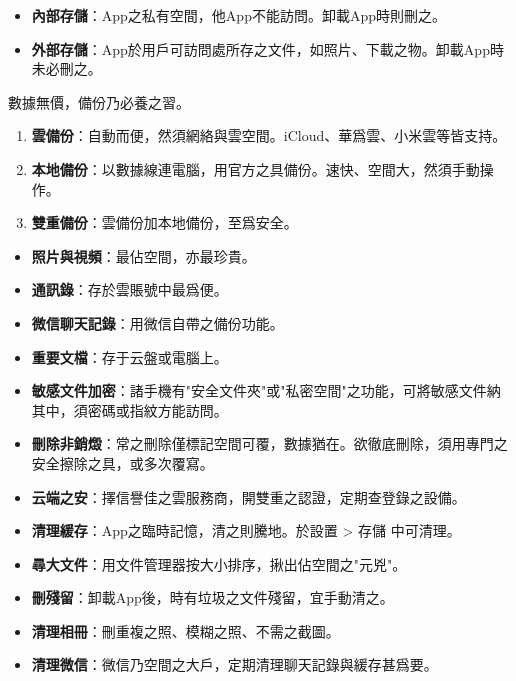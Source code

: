 
\begin{itemize}
  \item \textbf{內部存儲}：App之私有空間，他App不能訪問。卸載App時則刪之。
  \item \textbf{外部存儲}：App於用戶可訪問處所存之文件，如照片、下載之物。卸載App時未必刪之。
\end{itemize}


數據無價，備份乃必養之習。


\begin{enumerate}
  \item \textbf{雲備份}：自動而便，然須網絡與雲空間。iCloud、華爲雲、小米雲等皆支持。
  \item \textbf{本地備份}：以數據線連電腦，用官方之具備份。速快、空間大，然須手動操作。
  \item \textbf{雙重備份}：雲備份加本地備份，至爲安全。
\end{enumerate}


\begin{itemize}
  \item \textbf{照片與視頻}：最佔空間，亦最珍貴。
  \item \textbf{通訊錄}：存於雲賬號中最爲便。
  \item \textbf{微信聊天記錄}：用微信自帶之備份功能。
  \item \textbf{重要文檔}：存于云盤或電腦上。
\end{itemize}


\begin{itemize}
  \item \textbf{敏感文件加密}：諸手機有"安全文件夾"或"私密空間"之功能，可將敏感文件納其中，須密碼或指紋方能訪問。
  \item \textbf{刪除非銷燬}：常之刪除僅標記空間可覆，數據猶在。欲徹底刪除，須用專門之安全擦除之具，或多次覆寫。
  \item \textbf{云端之安}：擇信譽佳之雲服務商，開雙重之認證，定期查登錄之設備。
\end{itemize}


\begin{itemize}
  \item \textbf{清理緩存}：App之臨時記憶，清之則騰地。於設置 > 存儲 中可清理。
  \item \textbf{尋大文件}：用文件管理器按大小排序，揪出佔空間之"元兇"。
  \item \textbf{刪殘留}：卸載App後，時有垃圾之文件殘留，宜手動清之。
  \item \textbf{清理相冊}：刪重複之照、模糊之照、不需之截圖。
  \item \textbf{清理微信}：微信乃空間之大戶，定期清理聊天記錄與緩存甚爲要。
\end{itemize}

